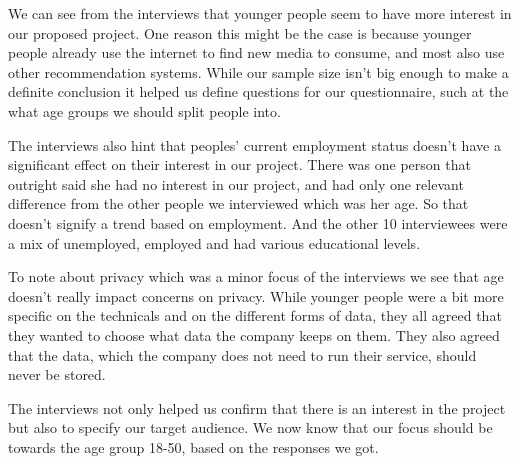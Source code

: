 We can see from the interviews that younger people seem to have more interest in our proposed project. One reason this might be the case is because younger people already use the internet to find new media to consume, and most also use other recommendation systems. While our sample size isn’t big enough to make a definite conclusion it helped us define questions for our questionnaire, such at the what age groups we should split people into. 

The interviews also hint that peoples’ current employment status doesn’t have a significant effect on their interest in our project. There was one person that outright said she had no interest in our project, and had only one relevant difference from the other people we interviewed which was her age. So that doesn’t signify a trend based on employment. And the other 10 interviewees were a mix of unemployed, employed and had various educational levels.

To note about privacy which was a minor focus of the interviews we see that age doesn’t really impact concerns on privacy. While younger people were a bit more specific on the technicals and on the different forms of data, they all agreed that they wanted to choose what data the company keeps on them. They also agreed that the data, which the company does not need to run their service, should never be stored.

The interviews not only helped us confirm that there is an interest in the project but also to specify our target audience. We now know that our focus should be towards the age group 18-50, based on the responses we got.